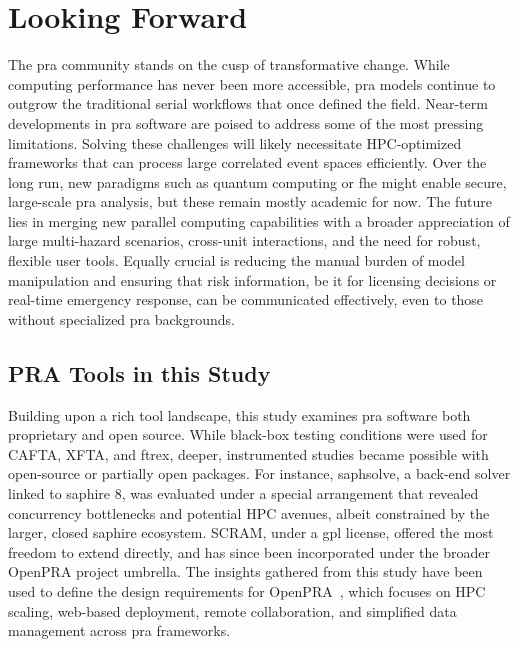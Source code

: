 \section{Looking Forward}
The \acrshort{pra} community stands on the cusp of transformative change. While computing performance has never been more accessible, \acrshort{pra} models continue to outgrow the traditional serial workflows that once defined the field. Near-term developments in \acrshort{pra} software are poised to address some of the most pressing limitations. Solving these challenges will likely necessitate HPC-optimized frameworks that can process large correlated event spaces efficiently. Over the long run, new paradigms such as quantum computing or \acrfull{fhe} might enable secure, large-scale \acrshort{pra} analysis, but these remain mostly academic for now. The future lies in merging new parallel computing capabilities with a broader appreciation of large multi-hazard scenarios, cross-unit interactions, and the need for robust, flexible user tools. Equally crucial is reducing the manual burden of model manipulation and ensuring that risk information, be it for licensing decisions or real-time emergency response, can be communicated effectively, even to those without specialized \acrshort{pra} backgrounds.

\subsection{PRA Tools in this Study}

Building upon a rich tool landscape, this study examines \acrshort{pra} software both proprietary and open source. While black-box testing conditions were used for CAFTA, XFTA, and \acrshort{ftrex}, deeper, instrumented studies became possible with open-source or partially open packages. For instance, \acrshort{saphsolve}, a back-end solver linked to \acrshort{saphire} 8, was evaluated under a special arrangement that revealed concurrency bottlenecks and potential HPC avenues, albeit constrained by the larger, closed \acrshort{saphire} ecosystem. SCRAM, under a \acrshort{gpl} license, offered the most freedom to extend directly, and has since been incorporated under the broader OpenPRA project umbrella. The insights gathered from this study have been used to define the design requirements for OpenPRA~\cite{openpra_initiative_openpra_2024}, which focuses on HPC scaling, web-based deployment, remote collaboration, and simplified data management across \acrshort{pra} frameworks.



